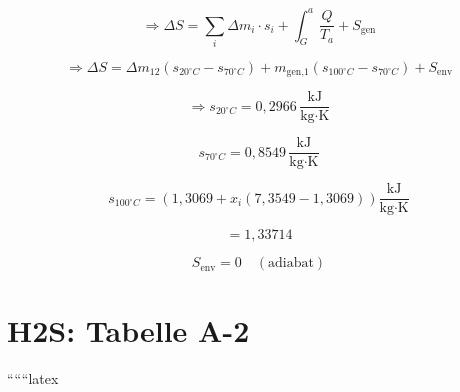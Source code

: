 \begin{equation*}
\Rightarrow \Delta S = \sum_{i} \Delta m_{i} \cdot s_{i} + \int_{G}^{a} \frac{Q}{T_{a}} + S_{\text{gen}}
\end{equation*}

\begin{equation*}
\Rightarrow \Delta S = \Delta m_{12} \left( s_{20^{\circ}C} - s_{70^{\circ}C} \right) + m_{\text{gen,1}} \left( s_{100^{\circ}C} - s_{70^{\circ}C} \right) + S_{\text{env}}
\end{equation*}

\begin{equation*}
\Rightarrow s_{20^{\circ}C} = 0,2966 \, \frac{\text{kJ}}{\text{kg} \cdot \text{K}}
\end{equation*}

\begin{equation*}
s_{70^{\circ}C} = 0,8549 \, \frac{\text{kJ}}{\text{kg} \cdot \text{K}}
\end{equation*}

\begin{equation*}
s_{100^{\circ}C} = \left( 1,3069 + x_{i} \left( 7,3549 - 1,3069 \right) \right) \frac{\text{kJ}}{\text{kg} \cdot \text{K}}
\end{equation*}

\begin{equation*}
= 1,33714
\end{equation*}

\begin{equation*}
S_{\text{env}} = 0 \quad (\text{adiabat})
\end{equation*}

\section*{H2S: Tabelle A-2}

``````latex


